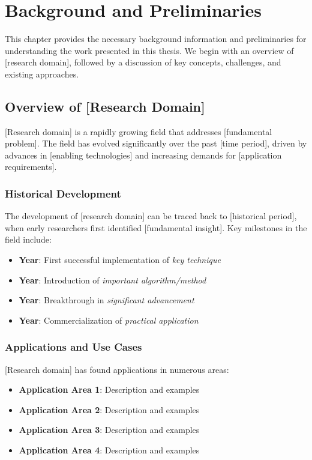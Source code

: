 \chapter{Background and Preliminaries}
\label{chapter:background}

This chapter provides the necessary background information and preliminaries for understanding the work presented in this thesis. We begin with an overview of [research domain], followed by a discussion of key concepts, challenges, and existing approaches.

\section{Overview of [Research Domain]}

[Research domain] is a rapidly growing field that addresses [fundamental problem]. The field has evolved significantly over the past [time period], driven by advances in [enabling technologies] and increasing demands for [application requirements].

\lipsum[1-2]

\subsection{Historical Development}

The development of [research domain] can be traced back to [historical period], when early researchers first identified [fundamental insight]. Key milestones in the field include:

\begin{itemize}
    \item \textbf{Year}: First successful implementation of \textit{key technique}
    \item \textbf{Year}: Introduction of \textit{important algorithm/method}
    \item \textbf{Year}: Breakthrough in \textit{significant advancement}
    \item \textbf{Year}: Commercialization of \textit{practical application}
\end{itemize}

\subsection{Applications and Use Cases}

[Research domain] has found applications in numerous areas:

\begin{itemize}
    \item \textbf{Application Area 1}: Description and examples
    \item \textbf{Application Area 2}: Description and examples
    \item \textbf{Application Area 3}: Description and examples
    \item \textbf{Application Area 4}: Description and examples
\end{itemize}

